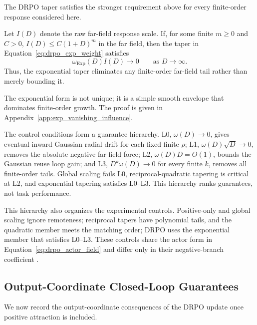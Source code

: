 The DRPO taper satisfies the stronger requirement above for every
finite-order response considered here.

\begin{proposition}
\label{prop:exp_vanishing_influence}
Let \(I(D)\) denote the raw far-field response scale. If, for some
finite \(m\geq0\) and \(C>0\),
\(I(D)\leq C(1+D)^m\) in the far field, then the taper in
Equation~\eqref{eq:drpo_exp_weight} satisfies
\[
    \omega_{\mathrm{Exp}}(D) I(D)
    \longrightarrow 0
    \qquad
    \text{as }D\to\infty .
\]
Thus, the exponential taper eliminates any finite-order far-field tail
rather than merely bounding it.
\end{proposition}

The exponential form is not unique; it is a simple smooth envelope that
dominates finite-order growth. The proof is given in
Appendix~\ref{app:exp_vanishing_influence}.

The control conditions form a guarantee hierarchy. L0,
\(\omega(D)\to0\), gives eventual inward Gaussian radial drift for each
fixed finite \(\rho\); L1, \(\omega(D)\sqrt D\to0\), removes the
absolute negative far-field force; L2, \(\omega(D)D=O(1)\), bounds the
Gaussian reuse loop gain; and L3,
\(D^k\omega(D)\to0\) for every finite \(k\), removes all finite-order
tails. Global scaling fails L0, reciprocal-quadratic tapering is critical at
L2, and exponential tapering satisfies L0--L3. This hierarchy ranks
guarantees, not task performance.

This hierarchy also organizes the experimental controls. Positive-only and
global scaling ignore remoteness; reciprocal tapers have polynomial tails, and the quadratic member meets the matching
order; DRPO uses the exponential member that satisfies
L0--L3. These controls share the actor form in
Equation~\eqref{eq:drpo_actor_field} and differ only in their negative-branch
coefficient \citep{peng2019advantage,nair2020awac,kostrikov2021offline,
grigsby2021closer,arnal2025asymmetric,leroux2025tapered}.

\subsection{Output-Coordinate Closed-Loop Guarantees}

We now record the output-coordinate consequences of the DRPO update once
positive attraction is included.

